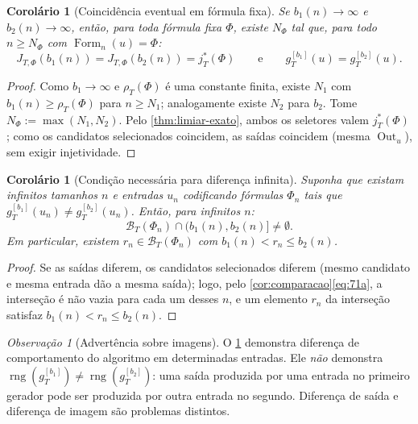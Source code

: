 \documentclass[11pt,a4paper]{article}
\newtheorem{corollary}[theorem]{Corolário}
\theoremstyle{definition}
\theoremstyle{remark}
\newtheorem*{remark}{Observação}
\newcommand{\Fm}{\operatorname{Form}}
\newcommand{\Out}{\operatorname{Out}}
\begin{document}
\begin{corollary}[Coincid\^{e}ncia eventual em f\'{o}rmula fixa]\label{cor:coincidencia}
Se $b_1(n) \to \infty$ e $b_2(n) \to \infty$, então, para toda fórmula fixa
$\Phi$, existe $N_\Phi$ tal que, para todo $n \geq N_\Phi$ com
$\Fm_n(u) = \Phi$:
\begin{equation}\label{eq:72}
  J_{T,\Phi}(b_1(n)) = J_{T,\Phi}(b_2(n)) = j^{*}_{T}(\Phi)
  \qquad\text{e}\qquad
  g_T^{[b_1]}(u) = g_T^{[b_2]}(u).
\end{equation}
\end{corollary}

\begin{proof}
Como $b_1 \to \infty$ e $\rho_T(\Phi)$ é uma constante finita, existe $N_1$ com
$b_1(n) \geq \rho_T(\Phi)$ para $n \geq N_1$; analogamente existe $N_2$ para
$b_2$. Tome $N_\Phi := \max(N_1, N_2)$. Pelo \cref{thm:limiar-exato}, ambos os
seletores valem $j^{*}_{T}(\Phi)$; como os candidatos selecionados coincidem,
as saídas coincidem (mesma $\Out_u$), sem exigir injetividade.
\end{proof}

\begin{corollary}[Condi\c{c}\~{a}o necess\'{a}ria para diferen\c{c}a infinita]\label{cor:diferenca-infinita}
Suponha que existam infinitos tamanhos $n$ e entradas $u_n$ codificando fórmulas
$\Phi_n$ tais que $g_T^{[b_1]}(u_n) \neq g_T^{[b_2]}(u_n)$. Então, para infinitos
$n$:
\begin{equation}\label{eq:73}
  \mathcal{B}_T(\Phi_n) \cap \bigl(b_1(n), b_2(n)\bigr] \neq \emptyset.
\end{equation}
Em particular, existem $r_n \in \mathcal{B}_T(\Phi_n)$ com
$b_1(n) < r_n \leq b_2(n)$.
\end{corollary}

\begin{proof}
Se as saídas diferem, os candidatos selecionados diferem (mesmo candidato e
mesma entrada dão a mesma saída); logo, pelo \cref{cor:comparacao}\eqref{eq:71a},
a interseção é não vazia para cada um desses $n$, e um elemento $r_n$ da
interseção satisfaz $b_1(n) < r_n \leq b_2(n)$.
\end{proof}

\begin{remark}[Advert\^{e}ncia sobre imagens]
O \cref{cor:diferenca-infinita} demonstra diferença de comportamento do
algoritmo em determinadas entradas. Ele \emph{não} demonstra
$\operatorname{rng}(g_T^{[b_1]}) \neq \operatorname{rng}(g_T^{[b_2]})$: uma
saída produzida por uma entrada no primeiro gerador pode ser produzida por outra
entrada no segundo. Diferença de saída e diferença de imagem são problemas
distintos.
\end{remark}
\end{document}
